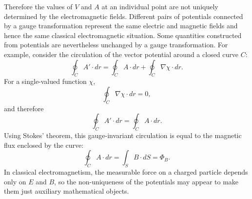 Therefore the values of \(V\) and \(A\) at an individual point are not
uniquely determined by the electromagnetic fields. Different pairs of
potentials connected by a gauge transformation represent the same
electric and magnetic fields and hence the same classical electromagnetic
situation. Some quantities constructed from potentials are nevertheless
unchanged by a gauge transformation. For example, consider the circulation of
the vector potential around a closed curve \(C\):
\[
	\oint_C A' \cdot dr = \oint_C A \cdot dr + \oint_C \nabla \chi \cdot dr.
\]
For a single-valued function \(\chi\),
\[
	\oint_C \nabla \chi \cdot d r = 0,
\]
and therefore
\[
	\oint_C A' \cdot dr = \oint_C A \cdot dr.
\]
Using Stokes' theorem, this gauge-invariant circulation is equal to the
magnetic flux enclosed by the curve:
\[
	\oint_C A \cdot dr = \int_S B \cdot dS = \Phi_B.
\]
In classical electromagnetism, the measurable force on a charged particle
depends only on \(E\) and \(B\), so the non-uniqueness of the
potentials may appear to make them just auxiliary mathematical objects.







